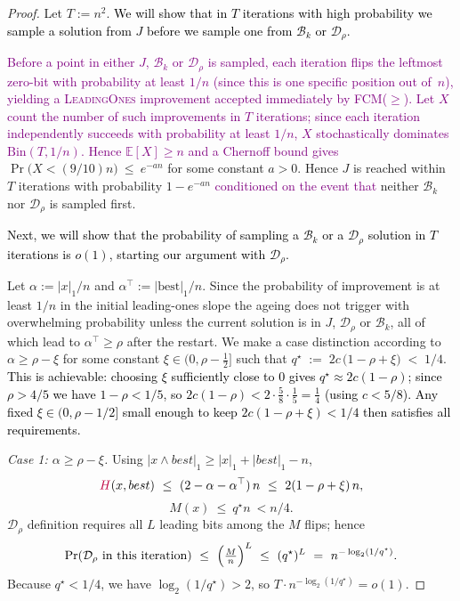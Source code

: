 \documentclass[lettersize,journal]{IEEEtran}
\newcommand{\rerev}[1]{\textcolor{purple}{#1}}
\newcommand{\EE}{\mathbb{E}}
\begin{document}
\begin{proof}
	Let $T:=n^2$. \textcolor{black}{We will show that in $T$ iterations with high probability we sample a solution from  $J$ before we sample one from $\mathcal{B}_k$ or $\mathcal{D}_\rho$.}

	\rerev{Before a point in either $J$, $\mathcal{B}_k$ or $\mathcal{D}_\rho$ is sampled, each iteration flips the leftmost zero-bit with probability at least $1/n$ (since this is one specific position out of~$n$), yielding a \textsc{LeadingOnes} improvement accepted immediately by FCM($\ge$).  Let $X$ count the number of such improvements in $T$ iterations; since each iteration independently succeeds with probability at least $1/n$, $X$ stochastically dominates $\mathrm{Bin}(T,1/n)$.  Hence $\EE[X]\ge n$ and a Chernoff bound gives}
	$
	\Pr\bigl(X<(9/10)n\bigr)\ \le\ e^{-a n}
	$
	for some constant $a>0$. Hence $J$ is reached within $T$ iterations with probability $1-e^{-a n}$ \rerev{conditioned on the event that} neither $\mathcal{B}_k$ nor $\mathcal{D}_\rho$ is sampled first.
	
	\textcolor{black}{
		Next, we will show that the probability of sampling a $\mathcal{B}_k$ or a $\mathcal{D}_\rho$ solution in $T$ iterations is $o(1)$, starting our argument with $\mathcal{D}_\rho$. 
		}
	
	Let $\alpha:=|x|_1/n$ and $\alpha^\top:=|\text{best}|_1/n$. Since the probability of improvement is at least $1/n$ in the initial leading-ones slope the ageing does not trigger with overwhelming probability unless the current solution is in $J$, $\mathcal{D}_\rho$ or $\mathcal{B}_k$, all of which lead to $\alpha^\top\ge\rho$ after the restart. We make a case distinction according to $\alpha\ge \rho-\xi$ for some constant $\xi\in(0,\rho-\tfrac12]$  such that	$q^\star \;:=\; 2c\,\bigl(1-\rho+\xi\bigr) \;<\; 1/4$.
\textcolor{black}{This is achievable: choosing $\xi$ sufficiently close to $0$ gives
$q^\star \approx 2c(1-\rho)$; since $\rho > 4/5$ we have $1-\rho < 1/5$,
so $2c(1-\rho) < 2 \cdot \tfrac{5}{8} \cdot \tfrac{1}{5} = \tfrac{1}{4}$
(using $c < 5/8$).  Any fixed $\xi \in (0, \rho - 1/2]$ small enough to
keep $2c(1-\rho+\xi) < 1/4$ then satisfies all requirements.}
	
	\emph{Case 1: $\alpha\ge \rho-\xi$.}
	Using $|x\wedge best|_1\ge |x|_1+|best|_1-n$,
	\[
	\rerev{H}(x,best)\ \le\ (2-\alpha-\alpha^\top)\,n\ \le\ 2(1-\rho+\xi)\,n,
	\]
	\[
	M(x)\ \le\ q^\star n\ <n/4
	.
	\]
	$\mathcal{D}_\rho$ definition requires all $L$ leading bits among the $M$ flips; hence
	\[
	\Pr(\text{$\mathcal{D}_\rho$ in this iteration})
	\ \le\
	\Bigl(\tfrac{M}{n}\Bigr)^{L}
	\ \le\
	(q^\star)^{L}
	\ =\
	n^{-\log_{2}(1/q^\star)}.
	\]
	Because $q^\star<1/4$, we have $\log_{2}(1/q^\star)>2$, so $T\cdot n^{-\log_{2}(1/q^\star)}=o(1)$.
	

\end{proof}
\end{document}
